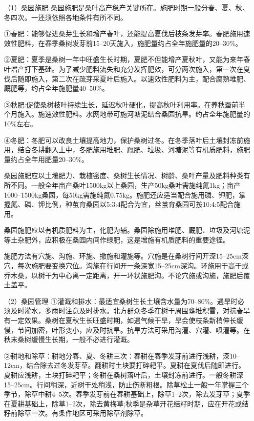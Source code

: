 \documentclass{ctexbook}
\begin{document}
（1）桑园施肥 桑园施肥是桑叶高产稳产关键所在。施肥时期一般分春、夏、秋、冬四次。一还须依照各地条件有所不同。

①春肥：能够促进桑芽生长和增产春叶，还能提高夏伐后枝条发芽率。春肥施用速效性肥料，在春季桑树发芽前15--20天施入，施肥量约占全年施肥量的20--30\%。

②夏肥：夏季是桑树一年中旺盛生长时期，夏肥不但能增产夏秋叶，又能为来年春叶增产打下基础。为了减少肥料流失和充分发挥肥效，可分两次施入，第一次在夏伐后随即施入，第二次在疏芽采夏叶后施入。以速效性肥料为主，配合腐熟堆肥、厩肥等，约占全年施肥量40--50\%。

③秋肥:促使桑树枝叶持续生长，延迟秋叶硬化，提高秋叶利用率。在养秋蚕前半个月施入。施速效性肥料。水网地带可施河塘泥结合桑园抗旱。约占全年施肥量的10\%左右。

④冬肥：冬肥可以改良土壤提高地力，保护桑树过冬。在冬季落叶后土壤封冻前施用，结合冬耕翻入土中，冬肥施用堆肥、厩肥、垃圾、河塘泥等有机质肥料，施肥量约占全年用肥量20--30\%。

桑园施肥应以土壤肥力、栽植密度、桑树生长情况、树龄、桑叶产量及肥料种类有所不同。一般全年亩产桑叶1500kg以上桑园，生产50kg桑叶需施纯氮1kg；亩产1000--1500kg桑园，每50kg需施纯氮0.75kg。施肥还应适当配合施用磷、钾肥，掌握氮、磷、钾比例，种茧育桑园以5:3:4配合为宜，丝茧育桑园可按10:4:5配合施用。

桑园施肥应以有机质肥料为主，化肥为辅。桑园除施用堆肥、厩肥、垃圾及河塘泥等土杂肥外，应积极在桑园内间作绿肥，这是增施有机质肥料的重要途径。

施肥方法有穴施、沟施、环施、撒施和灌施等。穴施是在桑树行间开深15--25cm深穴，每次施肥要变换穴位。沟施在行间开一条深宽15--25cm深沟。环施用于高干或乔木桑，以树干为中心离一定距离，开一环状施肥沟。不论穴施或沟施，施肥后覆土盖平。

（2）桑园管理
①灌溉和排水：最适宜桑树生长土壤含水量为70--80\%。遇旱时必须及时灌水，多雨时注意及时排水。北方群众冬季在树干周围壅堆积雪，对抗春旱有一定效果。桑树在夏秋生长旺盛时期，如遇气候干旱，旱会使枝条新梢伸长缓慢，节间加密，叶形变小，应及时抗旱。抗旱方法可采用沟灌、穴灌、喷灌等。在秋末桑树缓慢生长期，一般不必进行灌溉。

②耕地和除草：耕地分春、夏、冬耕三次：春耕在春季发芽前进行浅耕，深10--12cm，结合除去过冬发芽草。翻耕时土块要打碎耙平。夏耕在夏伐后随即进行。夏耕应浅耕，土块打碎耙平；冬耕在桑树落叶后，土壤封冻前进行。一般冬耕深15--25cm。行间稍深，近树干处稍浅，防止伤断粗根。除草松土一般一年掌握三个季节，除草中耕4--5次。春季发芽前在春耕基础上，除草1--2次，除去发芽草；夏季在夏耕基础上，除草1--2次，除去黄梅草;秋季是杂草开花结籽时期，应在开花或结籽前除草一次。有条件地区可采用除草剂除草。
\end{document}
